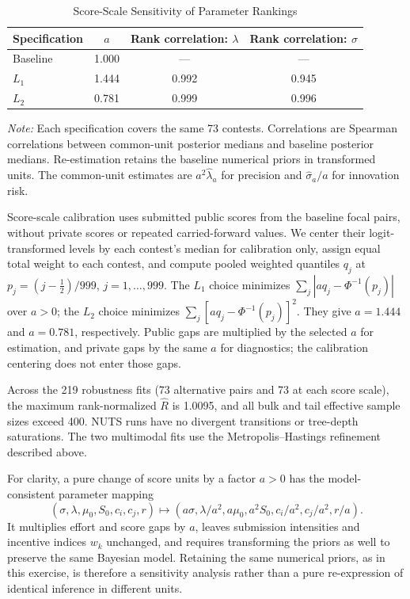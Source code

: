\documentclass[mnsc]{informs3}
\begin{document}
\begin{APPENDICES}
\begin{table}[!htbp]
\centering
\caption{Score-Scale Sensitivity of Parameter Rankings}
\label{tab-score-scale-robustness}
\begin{tabular}{lccc}
\toprule
Specification & $a$ & Rank correlation: $\lambda$ & Rank correlation: $\sigma$\\
\midrule
Baseline & 1.000 & --- & ---\\
$L_1$ & 1.444 & 0.992 & 0.945\\
$L_2$ & 0.781 & 0.999 & 0.996\\
\bottomrule
\end{tabular}
\par\vspace{0.5ex}\noindent
\begin{minipage}{\textwidth}
{\footnotesize\textit{Note:} Each specification covers the same 73 contests. Correlations are Spearman correlations between common-unit posterior medians and baseline posterior medians. Re-estimation retains the baseline numerical priors in transformed units.}
{The common-unit estimates are $a^2\hat\lambda_a$ for precision and $\hat\sigma_a/a$ for innovation risk.}
\end{minipage}
\end{table}

{Score-scale calibration uses submitted public scores from the baseline focal pairs, without private scores or repeated carried-forward values. We center their logit-transformed levels by each contest's median for calibration only, assign equal total weight to each contest, and compute pooled weighted quantiles $q_j$ at $p_j=(j-\tfrac12)/999$, $j=1,\ldots,999$. The $L_1$ choice minimizes $\sum_j|a q_j-\Phi^{-1}(p_j)|$ over $a>0$; the $L_2$ choice minimizes $\sum_j[a q_j-\Phi^{-1}(p_j)]^2$. They give $a=1.444$ and $a=0.781$, respectively. Public gaps are multiplied by the selected $a$ for estimation, and private gaps by the same $a$ for diagnostics; the calibration centering does not enter those gaps.}

Across the 219 robustness fits (73 alternative pairs and 73 at each score scale), the maximum rank-normalized $\widehat R$ is 1.0095, and all bulk and tail effective sample sizes exceed 400. NUTS runs have no divergent transitions or tree-depth saturations. The two multimodal fits use the Metropolis--Hastings refinement described above.

\begingroup
For clarity, a pure change of score units by a factor $a>0$ has the model-consistent parameter mapping
\[
(\sigma,\lambda,\mu_0,S_0,c_i,c_j,r)
\longmapsto
(a\sigma,\lambda/a^2,a\mu_0,a^2S_0,c_i/a^2,c_j/a^2,r/a).
\]
It multiplies effort and score gaps by $a$, leaves submission intensities and incentive indices $w_k$ unchanged, and requires transforming the priors as well to preserve the same Bayesian model. Retaining the same numerical priors, as in this exercise, is therefore a sensitivity analysis rather than a pure re-expression of identical inference in different units.
\par\endgroup


\end{APPENDICES}
\end{document}
